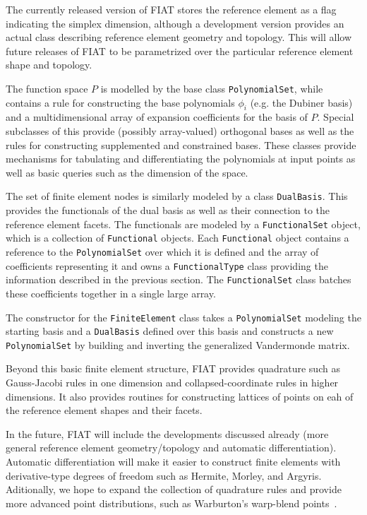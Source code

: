 The currently released version of FIAT stores the
reference element as a flag indicating the simplex dimension, although
a development version provides an actual class describing reference
element geometry and topology.  This will allow future releases of
FIAT to be parametrized over the particular reference element shape
and topology.  

The function space \( P \) is modelled by the base class
\texttt{PolynomialSet}, while  contains a rule for
constructing the base polynomials \( \phi_i \) (e.g. the Dubiner
basis) and a multidimensional
array of expansion coefficients for the basis of \( P \).  Special
subclasses of this provide (possibly array-valued) orthogonal bases as
well as the rules for constructing supplemented and constrained
bases.  These classes provide mechanisms for tabulating and
differentiating the polynomials at input points as well as basic
queries such as the dimension of the space.

The set of finite element nodes is similarly modeled by a class
\texttt{DualBasis}.  This provides the functionals of the dual basis
as well as their connection to the reference element facets.
The functionals are modeled by a \texttt{FunctionalSet} object, which
is a collection of \texttt{Functional} objects.
Each \texttt{Functional} object contains a
reference to the \texttt{PolynomialSet} over which it is defined and
the array of coefficients representing it and owns a
\texttt{FunctionalType} class providing the information described in
the previous section.  The
\texttt{FunctionalSet} class batches these coefficients together in a
single large array.

The constructor for the \texttt{FiniteElement} class takes a
\texttt{PolynomialSet} modeling the starting basis and a
\texttt{DualBasis} defined over this basis and constructs a new
\texttt{PolynomialSet} by building and inverting the generalized
Vandermonde matrix.

Beyond this basic finite element structure, FIAT provides quadrature
such as Gauss-Jacobi rules in one dimension and
collapsed-coordinate rules in higher dimensions.  It also provides
routines for constructing lattices of points on eah of the reference
element shapes and their facets.

In the future, FIAT will include the developments discussed already
(more general reference element geometry/topology and automatic
differentiation).  Automatic differentiation will make it easier to
construct finite elements with derivative-type degrees of freedom such
as Hermite, Morley, and Argyris.  Aditionally, 
we hope to expand the collection of quadrature
rules and provide more advanced point distributions, such as
Warburton's warp-blend points~\cite{War05}.

